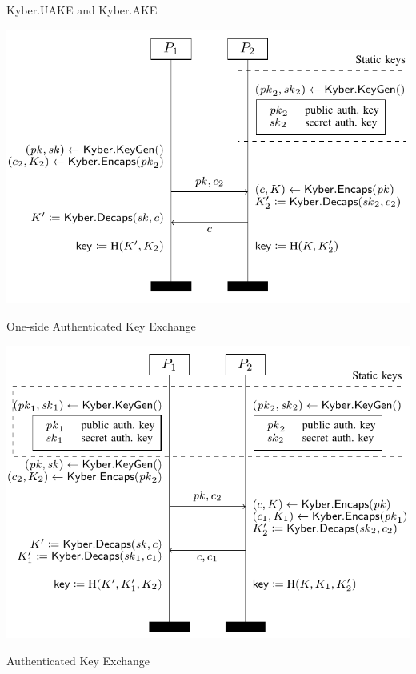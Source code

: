     \begin{frame}{Kyber.UAKE and Kyber.AKE}
        \begin{minipage}{0.45\linewidth}
            \begin{center}\includegraphics[scale=0.3]{./assets/uake.png}\end{center}

            One-side Authenticated Key Exchange
        \end{minipage}\hfill\begin{minipage}{0.45\linewidth}
            \begin{center}\includegraphics[scale=0.3]{./assets/ake.png}\end{center}

        Authenticated Key Exchange
        \end{minipage}
        
        \cite{kyber17}
    \end{frame}

